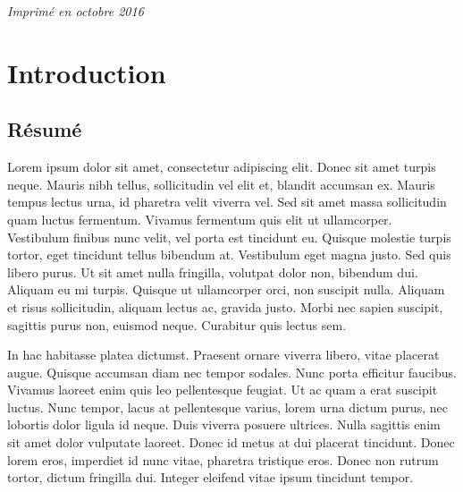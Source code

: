 \documentclass[12pt,fleqn,oneside,french,openany]{book} %
\begin{document}
\noindent \textit{Imprimé en octobre 2016}



\pagestyle{empty} %

\tableofcontents %


\pagestyle{fancy} %



\chapter{Introduction} \label{cha:introduction}

\section*{Résumé}

Lorem ipsum dolor sit amet, consectetur adipiscing elit. Donec sit amet turpis neque. Mauris nibh tellus, sollicitudin vel elit et, blandit accumsan ex. Mauris tempus lectus urna, id pharetra velit viverra vel. Sed sit amet massa sollicitudin quam luctus fermentum. Vivamus fermentum quis elit ut ullamcorper. Vestibulum finibus nunc velit, vel porta est tincidunt eu. Quisque molestie turpis tortor, eget tincidunt tellus bibendum at. Vestibulum eget magna justo. Sed quis libero purus. Ut sit amet nulla fringilla, volutpat dolor non, bibendum dui. Aliquam eu mi turpis. Quisque ut ullamcorper orci, non suscipit nulla. Aliquam et risus sollicitudin, aliquam lectus ac, gravida justo. Morbi nec sapien suscipit, sagittis purus non, euismod neque. Curabitur quis lectus sem.

In hac habitasse platea dictumst. Praesent ornare viverra libero, vitae placerat augue. Quisque accumsan diam nec tempor sodales. Nunc porta efficitur faucibus. Vivamus laoreet enim quis leo pellentesque feugiat. Ut ac quam a erat suscipit luctus. Nunc tempor, lacus at pellentesque varius, lorem urna dictum purus, nec lobortis dolor ligula id neque. Duis viverra posuere ultrices. Nulla sagittis enim sit amet dolor vulputate laoreet. Donec id metus at dui placerat tincidunt. Donec lorem eros, imperdiet id nunc vitae, pharetra tristique eros. Donec non rutrum tortor, dictum fringilla dui. Integer eleifend vitae ipsum tincidunt tempor.
\end{document}

